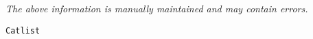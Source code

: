 \label{pkg:catlist}

{\tiny \it The above information is manually maintained and may contain errors.}
\begin{verbatim}
Catlist
\end{verbatim}
